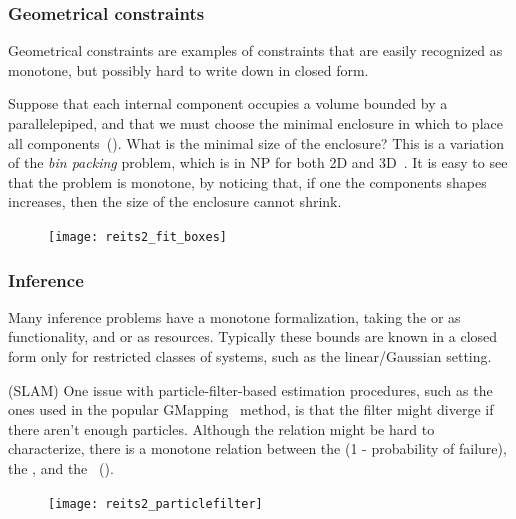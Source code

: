 \subsubsection{Geometrical constraints}

Geometrical constraints are examples of constraints that are easily
recognized as monotone, but possibly hard to write down in closed
form.

\begin{example}
Suppose that each internal component occupies a volume
bounded by a parallelepiped, and that we must choose the minimal enclosure
in which to place all components~(). What
is the minimal size of the enclosure? This is a variation of the \emph{bin
packing} problem, which is in NP for both 2D and 3D~\cite{lodi02two}.
It is easy to see that the problem is monotone, by noticing that,
if one the components shapes increases, then the size of the enclosure
cannot shrink.
\end{example}

\begin{figure}[h]
    \centering
\texttt{[image: reits2\_fit\_boxes]}
\caption{\label{fig:packing}}
\end{figure}


\subsubsection{Inference}

Many inference problems have a monotone formalization, taking the
 or  as functionality, and 
or  as resources. Typically these bounds are known in
a closed form only for restricted classes of systems, such as the
linear/Gaussian setting.

\begin{example}
(SLAM) One issue with particle-filter-based estimation procedures,
such as the ones used in the popular GMapping~\cite{grisetti07improved}
method, is that the filter might diverge if there aren't enough particles.
Although the relation might be hard to characterize, there is a monotone
relation between the  (1 - probability of failure),
the , and the ~().
\end{example}

\begin{figure}[h]
    \centering
\texttt{[image: reits2\_particlefilter]}
\caption{\label{fig:gmapping} }
\end{figure}



